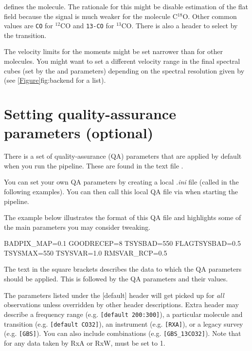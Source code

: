 \documentclass[11pt,oneside,chapters]{starlink}
\begin{document}
 defines the molecule.  The rationale for this might be
disable estimation of the flat field because the signal is much weaker
for the molecule C$^{18}$O.  Other common values are \texttt{CO} for
$^{12}$CO and \texttt{13-CO} for $^{13}$CO.  There is also a
 header to select by the transition.

The velocity limits for the moments might be set narrower than for
other molecules.  You might want to set a different velocity range in
the final spectral cubes (set by the  and
 parameters) depending on the spectral
resolution given by  (see
\cref{Figure}{fig:backend}{} for a list).


\section{Setting quality-assurance parameters (optional)}
\label{sec:qa}

There is a set of quality-assurance (QA) parameters that are applied
by default when you run the pipeline. These are found in the text file
.

You can set your own QA parameters by creating a local \textit{.ini}
file (called  in the following examples). You can then call
this local QA file via  when starting
the pipeline.

The example below illustrates the format of this QA file and
highlights some of the main parameters you may consider tweaking.

\vspace{0.2cm}
\begin{terminalv}
[default]
BADPIX_MAP=0.1
GOODRECEP=8
TSYSBAD=550
FLAGTSYSBAD=0.5
TSYSMAX=550
TSYSVAR=1.0
RMSVAR_RCP=0.5
\end{terminalv}
The text in the square brackets describes the data to which the QA
parameters should be applied. This is followed by the QA parameters
and their values.

The parameters listed under the [default] header will get picked up
for \textit{all} observations unless overridden by other header
descriptions. Extra header may describe a frequency range (e.g.
\texttt{[default 200:300]}), a particular molecule and transition
(e.g. \texttt{[default CO32]}), an instrument (e.g. \texttt{[RXA]}),
or a legacy survey (e.g. \texttt{[GBS]}). You can also include
combinations (e.g. \texttt{[GBS\_13CO32]}). Note that for any data
taken by RxA or RxW,  must be set to 1.
\end{document}
